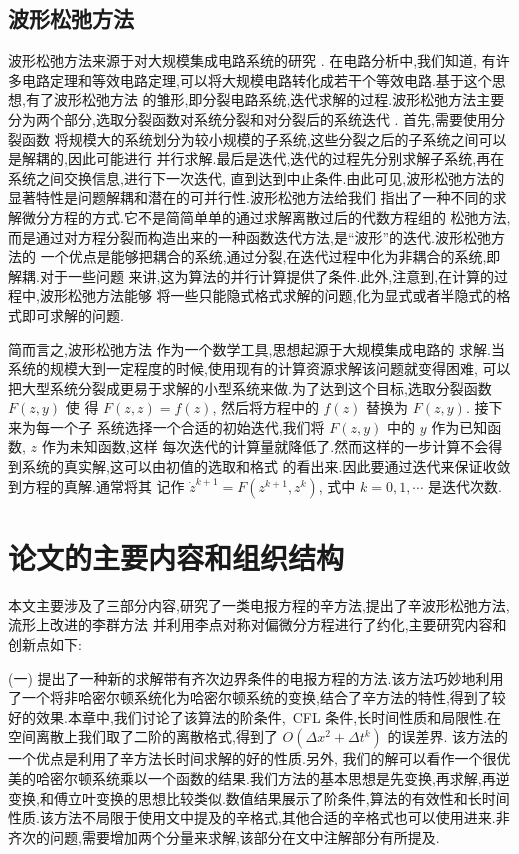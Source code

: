 \subsection{波形松弛方法}

波形松弛方法来源于对大规模集成电路系统的研究 \cite{lelarasmee1982waveform}. 在电路分析中,我们知道,
有许多电路定理和等效电路定理,可以将大规模电路转化成若干个等效电路.基于这个思想,有了波形松弛方法
的雏形,即分裂电路系统,迭代求解的过程.波形松弛方法主要分为两个部分,选取分裂函数对系统分裂和对分裂后的系统迭代
 \cite{jiang2009wr,burrage1995parallel,jacob1985waveform}. 首先,需要使用分裂函数
 将规模大的系统划分为较小规模的子系统,这些分裂之后的子系统之间可以是解耦的,因此可能进行
 并行求解.最后是迭代,迭代的过程先分别求解子系统,再在系统之间交换信息,进行下一次迭代,
直到达到中止条件.由此可见,波形松弛方法的显著特性是问题解耦和潜在的可并行性.波形松弛方法给我们
指出了一种不同的求解微分方程的方式.它不是简简单单的通过求解离散过后的代数方程组的
松弛方法,而是通过对方程分裂而构造出来的一种函数迭代方法,是``波形''的迭代.波形松弛方法的
一个优点是能够把耦合的系统,通过分裂,在迭代过程中化为非耦合的系统,即解耦.对于一些问题
来讲,这为算法的并行计算提供了条件.此外,注意到,在计算的过程中,波形松弛方法能够
将一些只能隐式格式求解的问题,化为显式或者半隐式的格式即可求解的问题.

简而言之,波形松弛方法 \cite{jiang2009wr} 作为一个数学工具,思想起源于大规模集成电路的
求解.当系统的规模大到一定程度的时候,使用现有的计算资源求解该问题就变得困难,
可以把大型系统分裂成更易于求解的小型系统来做.为了达到这个目标,选取分裂函数 $F(z,y)$ 使
得 $F(z,z)=f(z)$, 然后将方程中的 $f(z)$ 替换为 $F(z,y)$. 接下来为每一个子
系统选择一个合适的初始迭代,我们将 $F(z,y)$ 中的 $y$ 作为已知函数, $z$ 作为未知函数,这样
每次迭代的计算量就降低了.然而这样的一步计算不会得到系统的真实解,这可以由初值的选取和格式
的看出来.因此要通过迭代来保证收敛到方程的真解.通常将其
记作 $\dot{z}^{k+1}=F(z^{k+1},z^{k})$, 式中 $k=0,1,\cdots$ 是迭代次数.

\section{论文的主要内容和组织结构}

本文主要涉及了三部分内容,研究了一类电报方程的辛方法,提出了辛波形松弛方法,流形上改进的李群方法
并利用李点对称对偏微分方程进行了约化,主要研究内容和创新点如下:

(一) 提出了一种新的求解带有齐次边界条件的电报方程的方法.该方法巧妙地利用了一个将非哈密尔顿系统化为哈密尔顿系统的变换,结合了辛方法的特性,得到了较好的效果.本章中,我们讨论了该算法的阶条件,~CFL 条件,长时间性质和局限性.在空间离散上我们取了二阶的离散格式,得到了 $O(\Delta x^2+ \Delta
t^k)$ 的误差界. 该方法的一个优点是利用了辛方法长时间求解的好的性质.另外, 我们的解可以看作一个很优美的哈密尔顿系统乘以一个函数的结果.我们方法的基本思想是先变换,再求解,再逆变换,和傅立叶变换的思想比较类似.数值结果展示了阶条件,算法的有效性和长时间性质.该方法不局限于使用文中提及的辛格式,其他合适的辛格式也可以使用进来.非齐次的问题,需要增加两个分量来求解,该部分在文中注解部分有所提及.

